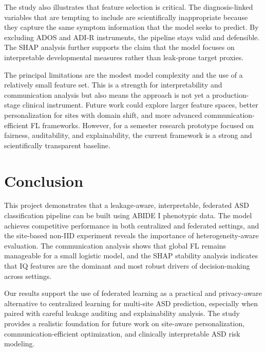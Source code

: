 \documentclass[sigconf]{acmart}
\begin{document}
The study also illustrates that feature selection is critical. The diagnosis-linked variables that are tempting to include are scientifically inappropriate because they capture the same symptom information that the model seeks to predict. By excluding ADOS and ADI-R instruments, the pipeline stays valid and defensible. The SHAP analysis further supports the claim that the model focuses on interpretable developmental measures rather than leak-prone target proxies.

The principal limitations are the modest model complexity and the use of a relatively small feature set. This is a strength for interpretability and communication analysis but also means the approach is not yet a production-stage clinical instrument. Future work could explore larger feature spaces, better personalization for sites with domain shift, and more advanced communication-efficient FL frameworks. However, for a semester research prototype focused on fairness, auditability, and explainability, the current framework is a strong and scientifically transparent baseline.

\section{Conclusion}
This project demonstrates that a leakage-aware, interpretable, federated ASD classification pipeline can be built using ABIDE I phenotypic data. The model achieves competitive performance in both centralized and federated settings, and the site-based non-IID experiment reveals the importance of heterogeneity-aware evaluation. The communication analysis shows that global FL remains manageable for a small logistic model, and the SHAP stability analysis indicates that IQ features are the dominant and most robust drivers of decision-making across settings.

Our results support the use of federated learning as a practical and privacy-aware alternative to centralized learning for multi-site ASD prediction, especially when paired with careful leakage auditing and explainability analysis. The study provides a realistic foundation for future work on site-aware personalization, communication-efficient optimization, and clinically interpretable ASD risk modeling.
\end{document}
